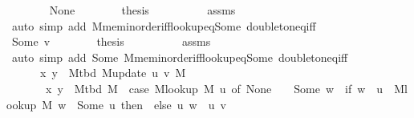 \begin{isabellebody}
\ \ \ \ \ \ \isamarkupfalse%
\ None\isanewline
\ \ \ \ \ \ \isamarkupfalse%
\ {\isacharquery}{\kern0pt}thesis\isanewline
\ \ \ \ \ \ \ \ \isamarkupfalse%
\ assms\isanewline
\ \ \ \ \ \ \ \ \isamarkupfalse%
\ {\isacharparenleft}{\kern0pt}auto\ simp\ add{\isacharcolon}{\kern0pt}\ M{\isachardot}{\kern0pt}mem{\isacharunderscore}{\kern0pt}inorder{\isacharunderscore}{\kern0pt}iff{\isacharunderscore}{\kern0pt}lookup{\isacharunderscore}{\kern0pt}eq{\isacharunderscore}{\kern0pt}Some\ doubleton{\isacharunderscore}{\kern0pt}eq{\isacharunderscore}{\kern0pt}iff{\isacharparenright}{\kern0pt}\isanewline
\ \ \ \ \isamarkupfalse%
\isanewline
\ \ \ \ \ \ \isamarkupfalse%
\ {\isacharparenleft}{\kern0pt}Some\ v{\isacharparenright}{\kern0pt}\isanewline
\ \ \ \ \ \ \isamarkupfalse%
\ {\isacharquery}{\kern0pt}thesis\isanewline
\ \ \ \ \ \ \ \ \isamarkupfalse%
\ assms\isanewline
\ \ \ \ \ \ \ \ \isamarkupfalse%
\ {\isacharparenleft}{\kern0pt}auto\ simp\ add{\isacharcolon}{\kern0pt}\ Some\ M{\isachardot}{\kern0pt}mem{\isacharunderscore}{\kern0pt}inorder{\isacharunderscore}{\kern0pt}iff{\isacharunderscore}{\kern0pt}lookup{\isacharunderscore}{\kern0pt}eq{\isacharunderscore}{\kern0pt}Some\ doubleton{\isacharunderscore}{\kern0pt}eq{\isacharunderscore}{\kern0pt}iff{\isacharparenright}{\kern0pt}\isanewline
\ \ \ \ \isamarkupfalse%
\isanewline
\ \ \ \ \isamarkupfalse%
\ \isamarkupfalse%
\isanewline
\ \ \ \ \ \ {\isachardoublequoteopen}{\isacharbraceleft}{\kern0pt}x{\isacharcomma}{\kern0pt}\ y{\isacharbraceright}{\kern0pt}\ {\isasymin}\ M{\isacharunderscore}{\kern0pt}tbd\ {\isacharparenleft}{\kern0pt}M{\isacharunderscore}{\kern0pt}update\ u\ v\ M{\isacharparenright}{\kern0pt}\ {\isasymlongleftrightarrow}\isanewline
\ \ \ \ \ \ \ {\isacharbraceleft}{\kern0pt}x{\isacharcomma}{\kern0pt}\ y{\isacharbraceright}{\kern0pt}\ {\isasymin}\ M{\isacharunderscore}{\kern0pt}tbd\ M\ {\isacharminus}{\kern0pt}\ {\isacharparenleft}{\kern0pt}case\ M{\isacharunderscore}{\kern0pt}lookup\ M\ u\ of\ None\ {\isasymRightarrow}\ {\isacharbraceleft}{\kern0pt}{\isacharbraceright}{\kern0pt}\ {\isacharbar}{\kern0pt}\ Some\ w\ {\isasymRightarrow}\ if\ w\ {\isasymnoteq}\ u\ {\isasymand}\ M{\isacharunderscore}{\kern0pt}lookup\ M\ w\ {\isacharequal}{\kern0pt}\ Some\ u\ then\ {\isacharbraceleft}{\kern0pt}{\isacharbraceright}{\kern0pt}\ else\ {\isacharbraceleft}{\kern0pt}{\isacharbraceleft}{\kern0pt}u{\isacharcomma}{\kern0pt}\ w{\isacharbraceright}{\kern0pt}{\isacharbraceright}{\kern0pt}{\isacharparenright}{\kern0pt}\ {\isasymunion}\ {\isacharbraceleft}{\kern0pt}{\isacharbraceleft}{\kern0pt}u{\isacharcomma}{\kern0pt}\ v{\isacharbraceright}{\kern0pt}{\isacharbraceright}{\kern0pt}{\isachardoublequoteclose}\isanewline

\end{isabellebody}
